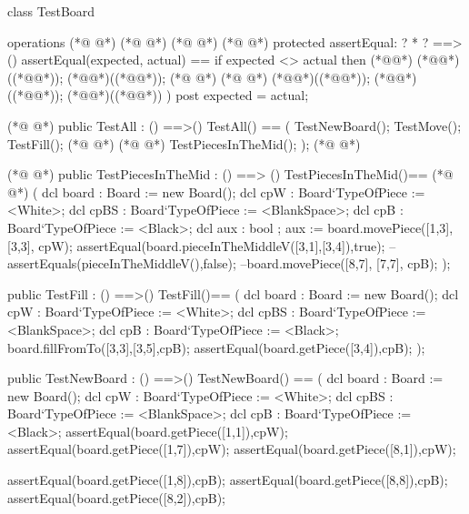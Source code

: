 \begin{vdmpp}[breaklines=true]
class TestBoard 
 
operations
(*@
\label{TestNewBoard:4}
@*)
(*@
\label{TestBoard:4}
@*)
(*@
\label{assertTrue:4}
@*)
(*@
\label{assertTrue:4}
@*)
protected assertEqual: ? * ? ==> ()
 assertEqual(expected, actual) == 
  if expected <> actual then (*@\vdmnotcovered{(}@*)
    (*@@*)((*@@*));
    (*@@*)((*@@*)); 
(*@
\label{assertEqual:9}
@*)
(*@
\label{assertEqual:9}
@*)
    (*@@*)((*@@*));
    (*@@*)((*@@*));
    (*@@*)((*@@*))
  )
 post expected = actual;

(*@
\label{TestAll:15}
@*)
 public TestAll : () ==>()
 TestAll() ==
 (
  TestNewBoard();
  TestMove();
  TestFill();
(*@
\label{TestCanItdMove:21}
@*)
(*@
\label{TestCanItdMove:21}
@*)
  TestPiecesInTheMid();
 );
(*@
\label{TestFill:23}
@*)
 
(*@
\label{TestPiecesInTheMid:24}
@*)
 public TestPiecesInTheMid : () ==> ()
 TestPiecesInTheMid()==
(*@
\label{TestMove:26}
@*)
 (
  dcl board : Board := new Board();
  dcl cpW : Board`TypeOfPiece := <White>;
  dcl cpBS : Board`TypeOfPiece := <BlankSpace>;
  dcl cpB : Board`TypeOfPiece := <Black>;
  dcl aux : bool ;
  aux := board.movePiece([1,3], [3,3], cpW);
  assertEqual(board.pieceInTheMiddleV([3,1],[3,4]),true);
  --assertEquals(pieceInTheMiddleV(),false);
  --board.movePiece([8,7], [7,7], cpB);
 );
 
 
 public TestFill : () ==>()
 TestFill()==
 (
  dcl board : Board := new Board();
  dcl cpW : Board`TypeOfPiece := <White>;
  dcl cpBS : Board`TypeOfPiece := <BlankSpace>;
  dcl cpB : Board`TypeOfPiece := <Black>;
  board.fillFromTo([3,3],[3,5],cpB);
  assertEqual(board.getPiece([3,4]),cpB);
 );
 
 
 public TestNewBoard : () ==>()
 TestNewBoard() ==
 (
  dcl board : Board := new Board();
  dcl cpW : Board`TypeOfPiece := <White>;
  dcl cpBS : Board`TypeOfPiece := <BlankSpace>;
  dcl cpB : Board`TypeOfPiece := <Black>;
  assertEqual(board.getPiece([1,1]),cpW);
  assertEqual(board.getPiece([1,7]),cpW);
  assertEqual(board.getPiece([8,1]),cpW);
  
  assertEqual(board.getPiece([1,8]),cpB);
  assertEqual(board.getPiece([8,8]),cpB);
  assertEqual(board.getPiece([8,2]),cpB);
  

\end{vdmpp}

